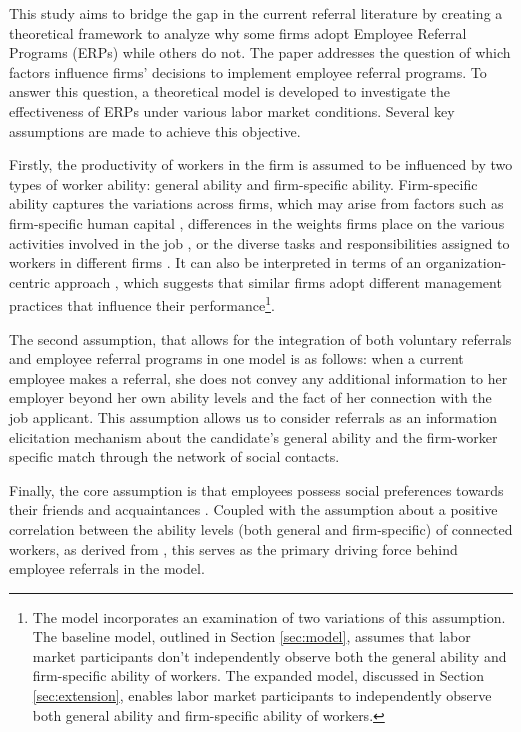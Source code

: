 \documentclass[12pt]{article}
\begin{document}
This study aims to bridge the gap in the current referral literature by creating a theoretical framework to analyze why some firms adopt Employee Referral Programs (ERPs) while others do not. The paper addresses the question of which factors influence firms' decisions to implement employee referral programs. To answer this question, a theoretical model is developed to investigate the effectiveness of ERPs under various labor market conditions. Several key assumptions are made to achieve this objective.

Firstly, the productivity of workers in the firm is assumed to be influenced by two types of worker ability: general ability and firm-specific ability. Firm-specific ability captures the variations across firms, which may arise from factors such as firm-specific human capital \citep{becker1962investment, becker1975investment}, differences in the weights firms place on the various activities involved in the job \citep{lazear2009firm}, or the diverse tasks and responsibilities assigned to workers in different firms \citep{gibbons2004task}. It can also be interpreted in terms of an organization-centric approach \citep{bloom2019drives, dessein2022organizational}, which suggests that similar firms adopt different management practices that influence their performance\footnote{The model incorporates an examination of two variations of this assumption. The baseline model, outlined in Section \ref{sec:model}, assumes that labor market participants don't independently observe both the general ability and firm-specific ability of workers. The expanded model, discussed in Section \ref{sec:extension}, enables labor market participants to independently observe both general ability and firm-specific ability of workers.}.

The second assumption, that allows for the integration of both voluntary referrals and employee referral programs in one model is as follows: when a current employee makes a referral, she does not convey any additional information to her employer beyond her own ability levels and the fact of her connection with the job applicant. This assumption allows us to consider referrals as an information elicitation mechanism about the candidate's general ability and the firm-worker specific match through the network of social contacts.

Finally, the core assumption is that employees possess social preferences towards their friends and acquaintances \citep{bandiera2009social, friebel2023employee}. Coupled with the assumption about a positive correlation between the ability levels (both general and firm-specific) of connected workers, as derived from \cite{montgomery1991social}, this serves as the primary driving force behind employee referrals in the model.
\end{document}
